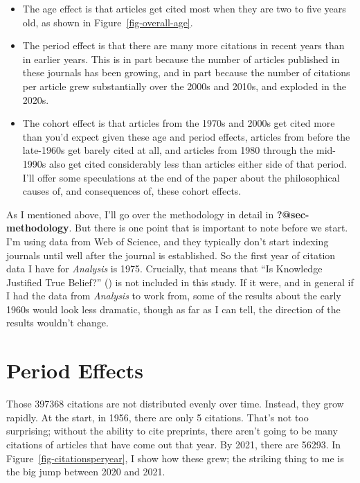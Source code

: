 \documentclass[
  12pt,
  letterpaper,
  DIV=11,
  numbers=noendperiod]{scrartcl}
\providecommand{\tightlist}{%
  \setlength{\itemsep}{0pt}\setlength{\parskip}{0pt}}\usepackage{longtable,booktabs,array}
\begin{document}
\begin{itemize}
\tightlist
\item
  The age effect is that articles get cited most when they are two to
  five years old, as shown in Figure~\ref{fig-overall-age}.
\item
  The period effect is that there are many more citations in recent
  years than in earlier years. This is in part because the number of
  articles published in these journals has been growing, and in part
  because the number of citations per article grew substantially over
  the 2000s and 2010s, and exploded in the 2020s.
\item
  The cohort effect is that articles from the 1970s and 2000s get cited
  more than you'd expect given these age and period effects, articles
  from before the late-1960s get barely cited at all, and articles from
  1980 through the mid-1990s also get cited considerably less than
  articles either side of that period. I'll offer some speculations at
  the end of the paper about the philosophical causes of, and
  consequences of, these cohort effects.
\end{itemize}

As I mentioned above, I'll go over the methodology in detail in
\textbf{?@sec-methodology}. But there is one point that is important to
note before we start. I'm using data from Web of Science, and they
typically don't start indexing journals until well after the journal is
established. So the first year of citation data I have for
\emph{Analysis} is 1975. Crucially, that means that ``Is Knowledge
Justified True Belief?'' () is
not included in this study. If it were, and in general if I had the data
from \emph{Analysis} to work from, some of the results about the early
1960s would look less dramatic, though as far as I can tell, the
direction of the results wouldn't change.

\section{Period Effects}\label{sec-period}

Those 397368 citations are not distributed evenly over time. Instead,
they grow rapidly. At the start, in 1956, there are only 5 citations.
That's not too surprising; without the ability to cite preprints, there
aren't going to be many citations of articles that have come out that
year. By 2021, there are 56293. In Figure~\ref{fig-citationsperyear}, I
show how these grew; the striking thing to me is the big jump between
2020 and 2021.
\end{document}
